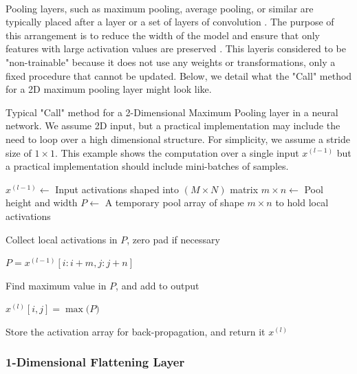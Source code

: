 \documentclass[12pt,letterpaper]{article}
\begin{document}
\paragraph*{}Pooling layers, such as maximum pooling, average pooling, or similar are typically placed after a layer or a set of layers of convolution \cite{Loy}. The purpose of this arrangement is to reduce the width of the model and ensure that only features with large activation values are preserved \cite{Geron,Loy,Goodfellow}. This layeris considered to be "non-trainable" because it does not use any weights or transformations, only a fixed procedure that cannot be updated. Below, we detail what the "Call" method for a 2D maximum pooling layer might look like.

\begin{algorithm}[H]
\caption{Typical "Call" method for a 2-Dimensional Maximum Pooling layer in a neural network. We assume 2D input, but a practical implementation may include the need to loop over a high dimensional structure. For simplicity, we assume a stride size of $1 \times 1$. This example shows the computation over a single input $x^{(l-1)}$ but a practical implementation should include mini-batches of samples.}
\label{alg-CallPool2D}

\begin{algorithmic}
\REQUIRE $x^{(l-1)} \leftarrow$ Input activations shaped into $(M \times N)$ matrix
\REQUIRE $m \times n \leftarrow$ Pool height and width
\REQUIRE $P \leftarrow$ A temporary pool array of shape $m \times n $ to hold local activations

		\item Collect local activations in $P$, zero pad if necessary
		\item $P = x^{(l-1)}[i:i+m,j:j+n]$
		\item Find maximum value in $P$, and add to output
		\item $x^{(l)}[i,j] = \max\big( P \big)$
	\ENDFOR
\ENDFOR

Store the activation array for back-propagation, and return it
\RETURN $x^{(l)}$

\end{algorithmic}
\end{algorithm}


\subsubsection{1-Dimensional Flattening Layer}
\label{subsubsec-1DFlatten}
\end{document}

